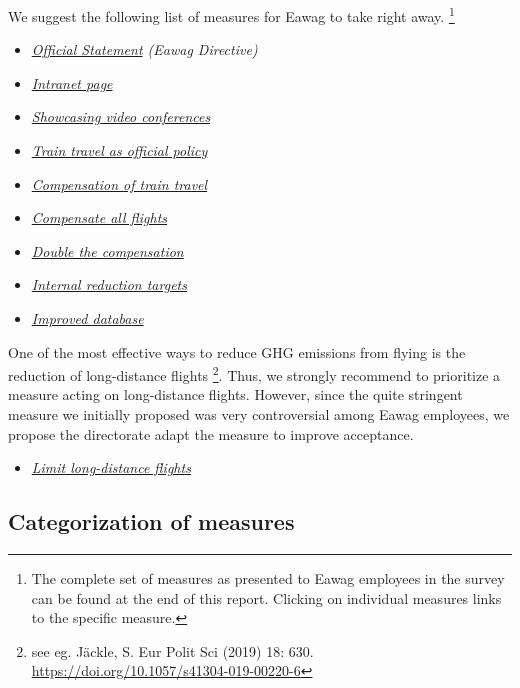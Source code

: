 \documentclass[]{tufte-handout}
\providecommand{\tightlist}{%
  \setlength{\itemsep}{0pt}\setlength{\parskip}{0pt}}
\begin{document}
We suggest the following list of measures for Eawag to take right away.
\footnote{The complete set of measures as presented to Eawag employees
  in the survey can be found at the end of this report. Clicking on
  individual measures links to the specific measure.}

\begin{itemize}
\item
  \emph{\protect\hyperlink{official}{Official Statement} (Eawag
  Directive)}
\item
  \protect\hyperlink{intranet}{\emph{Intranet page}}
\item
  \protect\hyperlink{showcase_video}{\emph{Showcasing video
  conferences}}
\item
  \protect\hyperlink{train_travel_official_policy}{\emph{Train travel as
  official policy}}
\item
  \protect\hyperlink{train_travel_compensate}{\emph{Compensation of
  train travel}}
\item
  \protect\hyperlink{compensate_all_flighs}{\emph{Compensate all
  flights}}
\item
  \protect\hyperlink{double_compensation}{\emph{Double the
  compensation}}
\item
  \protect\hyperlink{internal_competition}{\emph{Internal reduction
  targets}}
\item
  \protect\hyperlink{database}{\emph{Improved database}}
\end{itemize}

One of the most effective ways to reduce GHG emissions from flying is
the reduction of long-distance flights \footnote{see eg. Jäckle, S. Eur
  Polit Sci (2019) 18: 630.
  \url{https://doi.org/10.1057/s41304-019-00220-6}}. Thus, we strongly
recommend to prioritize a measure acting on long-distance flights.
However, since the quite stringent measure we initially proposed was
very controversial among Eawag employees, we propose the directorate
adapt the measure to improve acceptance.

\begin{itemize}
\tightlist
\item
  \protect\hyperlink{overseas_restriction}{\emph{Limit long-distance
  flights}}
\end{itemize}

\hypertarget{categorization-of-measures}{%
\subsection{Categorization of
measures}\label{categorization-of-measures}}
\end{document}
